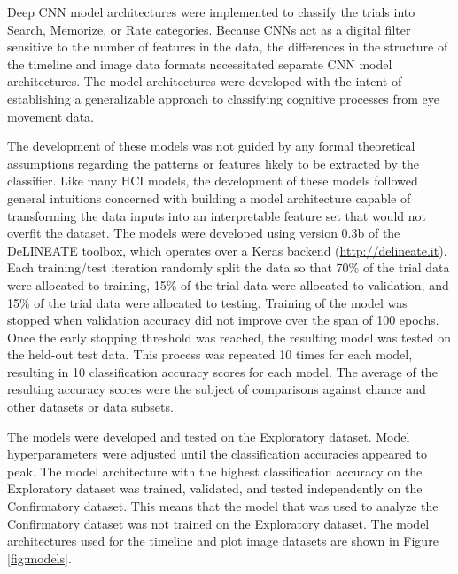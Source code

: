 \documentclass[
  english,
  man,floatsintext]{apa6}
\begin{document}
Deep CNN model architectures were implemented to classify the trials into Search, Memorize, or Rate categories. Because CNNs act as a digital filter sensitive to the number of features in the data, the differences in the structure of the timeline and image data formats necessitated separate CNN model architectures. The model architectures were developed with the intent of establishing a generalizable approach to classifying cognitive processes from eye movement data.

The development of these models was not guided by any formal theoretical assumptions regarding the patterns or features likely to be extracted by the classifier. Like many HCI models, the development of these models followed general intuitions concerned with building a model architecture capable of transforming the data inputs into an interpretable feature set that would not overfit the dataset. The models were developed using version 0.3b of the DeLINEATE toolbox, which operates over a Keras backend (\url{http://delineate.it}). Each training/test iteration randomly split the data so that 70\% of the trial data were allocated to training, 15\% of the trial data were allocated to validation, and 15\% of the trial data were allocated to testing. Training of the model was stopped when validation accuracy did not improve over the span of 100 epochs. Once the early stopping threshold was reached, the resulting model was tested on the held-out test data. This process was repeated 10 times for each model, resulting in 10 classification accuracy scores for each model. The average of the resulting accuracy scores were the subject of comparisons against chance and other datasets or data subsets.

The models were developed and tested on the Exploratory dataset. Model hyperparameters were adjusted until the classification accuracies appeared to peak. The model architecture with the highest classification accuracy on the Exploratory dataset was trained, validated, and tested independently on the Confirmatory dataset. This means that the model that was used to analyze the Confirmatory dataset was not trained on the Exploratory dataset. The model architectures used for the timeline and plot image datasets are shown in Figure \ref{fig:models}.
\end{document}
